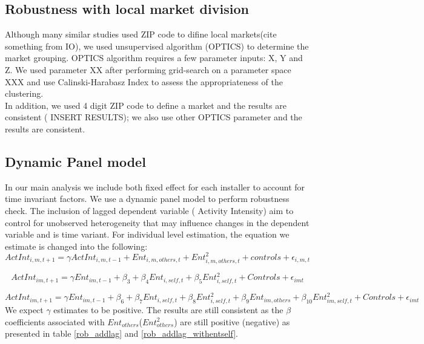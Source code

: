 \documentclass[msom,blindrev]{informs3}
\begin{document}
\subsection{Robustness with local market division}
Although many similar studies used ZIP code to difine local markets(cite something from IO), we used unsupervised algorithm (OPTICS) to determine the market grouping. OPTICS algorithm requires a few parameter inputs: X, Y and Z. We used parameter XX after performing grid-search on a parameter space XXX and use Calinski-Harabasz Index to assess the appropriateness of the clustering.  \\ In addition, we used 4 digit ZIP code to define a market and the results are consistent ( INSERT RESULTS); we also use other OPTICS parameter and the results are consistent.  \\

\subsection{Dynamic Panel model}
In our main analysis we include both fixed effect for each installer to account for time invariant factors. We use a dynamic panel model to perform robustness check. The inclusion of lagged dependent variable ( Activity Intensity) aim to control for unobserved heterogeneity that may influence changes in the dependent variable and is time variant. For individual level estimation, the equation we estimate is changed into the following: 
\begin{equation}
    ActInt_{i,m,t+1}=\gamma ActInt_{i,m,t-1}+Ent_{i,m,others,t}+Ent_{i,m,others,t}^2+  
    controls+\epsilon_{i,m,t} 
\end{equation}

\begin{equation}
    ActInt_{im,t+1}=\gamma Ent_{im,t-1}+\beta_{3}+\beta_{4} Ent_{i,self,t}+\beta_{5}Ent_{i,self,t}^2+  
   Controls+\epsilon_{imt} 
   \label{model_ind_dyn_1}
\end{equation}

\begin{equation}
    ActInt_{im,t+1}=\gamma Ent_{im,t-1}+\beta_{6}+\beta_{7} Ent_{i,self,t}+\beta_{8}Ent_{i,self,t}^2+\beta_{9}Ent_{im,others}+\beta_{10}Ent_{im,self,t}^2+  
   Controls+\epsilon_{imt} 
   \label{model_ind_dyn_2}
\end{equation}
We expect $\gamma$ estimates to be positive. The results are still consistent as the $\beta$ coefficients associated with $Ent_{others}$($Ent_{others}^2$) are still positive (negative) as presented in table \ref{rob_addlag} and \ref{rob_addlag_withentself}. 
\end{document}
